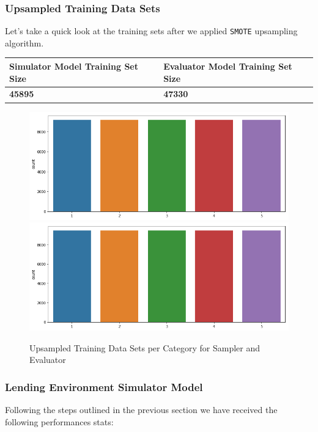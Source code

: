 \hypertarget{upsampled-training-data-sets}{%
\subsubsection{Upsampled Training Data
Sets}\label{upsampled-training-data-sets}}

Let's take a quick look at the training sets after we applied
\texttt{SMOTE} upsampling algorithm.

\begin{longtable}[]{@{}ll@{}}
\toprule
Simulator Model Training Set Size & Evaluator Model Training Set
Size\tabularnewline
\midrule
\endhead
\textbf{45895} & \textbf{47330}\tabularnewline
\bottomrule
\end{longtable}

\begin{Schunk}
\begin{figure}[H]

{\centering \includegraphics[width=0.49\linewidth,height=0.2\textheight]{../../artifacts/upsampled_simulator} \includegraphics[width=0.49\linewidth,height=0.2\textheight]{../../artifacts/upsampled_evaluator} 

}

\caption[Upsampled Training Data Sets per Category for Sampler and Evaluator]{Upsampled Training Data Sets per Category for Sampler and Evaluator}\label{fig:upsampled}
\end{figure}
\end{Schunk}

\hypertarget{lending-environment-simulator-model}{%
\subsubsection{Lending Environment Simulator
Model}\label{lending-environment-simulator-model}}

Following the steps outlined in the previous section we have received
the following performances stats:

